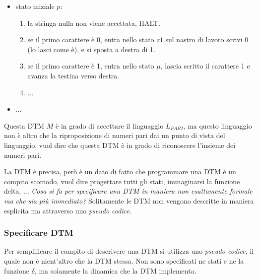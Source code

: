 \documentclass{article}
\begin{document}
\begin{itemize}
    \item stato iniziale $p$:
          \begin{enumerate}
              \item la stringa nulla non viene accettata, HALT.
              \item se il primo carattere è 0, entra nello stato $z1$ sul
                    nastro di lavoro scrivi 0 (lo lasci come è), e si sposta a destra di 1.
              \item se il primo carattere è 1, entra nello stato $\mu$, lascia scritto
                    il carattere 1 e avanza la testina verso destra.
              \item $\dots$
          \end{enumerate}
    \item $\dots$
\end{itemize}
Questa DTM $M$ è in grado di accettare il linguaggio $L_{PARI}$, ma questo linguaggio
non è altro che la riproposizione di numeri pari dai un punto di
vista del linguaggio, vuol dire che questa DTM è in grado di riconoscere l'insieme
dei numeri pari.

La DTM è precisa, però è un dato di fatto che programmare una DTM è un compito
scomodo, vuol dire progettare tutti gli stati, immaginarsi la funzione delta, $\dots$
\textit{Cosa si fa per specificare una DTM in maniera non esattamente
    formale ma che sia più immediato?} Solitamente le DTM non vengono descritte
in maniera esplicita ma attraverso uno \textit{pseudo codice}.

\subsubsection{Specificare DTM}
Per semplificare il compito di descrivere una DTM si utilizza uno \textit{pseudo codice},
il quale non è nient'altro che la DTM stessa. Non sono specificati ne stati e ne
la funzione $\delta$, ma solamente la dinamica che la DTM implementa.
\end{document}
